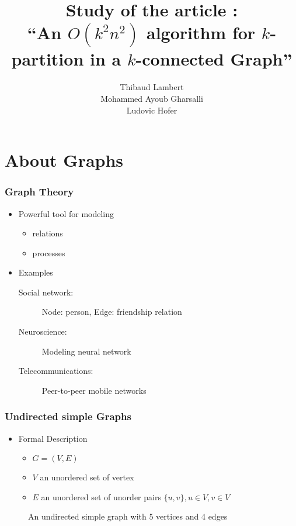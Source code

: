 \documentclass[xcolor=dvipsnames]{beamer}
\title[$O(k^2n^2)$ algorithm for $k$-partitioning]{Study of the article :\\``An $O(k^2n^2)$ algorithm for $k$-partition in a $k$-connected Graph''}
\author[Lambert, Gharsalli, Hofer]
       {Thibaud Lambert\\Mohammed Ayoub Gharsalli\\Ludovic Hofer}
\institute{University of Bordeaux I}
\begin{document}
\begin{frame}[plain]
  \maketitle
\end{frame}

\section{About Graphs}

\begin{frame}
  \frametitle{Graph Theory}
  \begin{itemize}
  \item Powerful tool for modeling
    \begin{itemize}
    \item relations
    \item processes
    \end{itemize}
  \item Examples
    \begin{description}
     \item [Social network:] Node: person, Edge: friendship relation
     \item [Neuroscience:] Modeling neural network  \cite{BuSp09}
     \item [Telecommunications:] Peer-to-peer mobile networks  \cite{FaCh99}
    \end{description}
  \end{itemize}
\end{frame}

\begin{frame}
  \frametitle{Undirected simple Graphs}
  \begin{itemize}
    \item Formal Description
      \begin{itemize}
      \item $G = (V,E)$
      \item $V$ an unordered set of vertex
      \item $E$ an unordered set of unorder pairs $\{u,v\}, u \in V, v \in V$
      \end{itemize}
  \end{itemize}
  \begin{figure}
    \begin{center}
    
    \end{center}
    \caption{An undirected simple graph with 5 vertices and 4 edges}
  \end{figure}
\end{frame}
\end{document}
